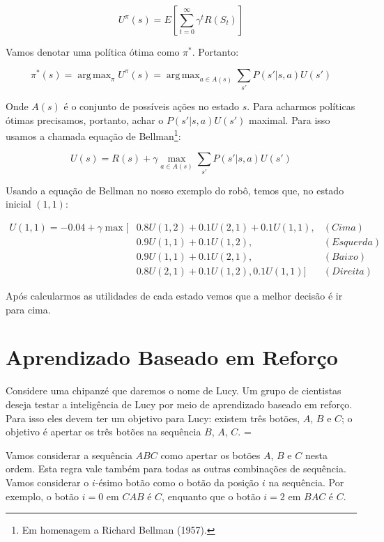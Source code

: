 \documentclass[a4paper,10pt]{article}
\DeclareMathOperator*{\argmax}{arg\,max}
\theoremstyle{plain}
\begin{document}
\begin{equation*}
  U^\pi(s) = E\left[\sum_{t=0}^\infty \gamma^t R(S_t)\right]
\end{equation*}

Vamos denotar uma política ótima como $\pi^*$. Portanto:

\begin{equation*}
  \pi^*(s) = \argmax_\pi U^\pi(s) = \argmax_{a \in A(s)} \sum_{s'} P(s'|s,a)U(s')
\end{equation*}

Onde $A(s)$ é o conjunto de possíveis ações no estado $s$. Para acharmos políticas ótimas
precisamos, portanto, achar o $P(s'|s,a)U(s')$ maximal. Para isso usamos a chamada equação de
Bellman\footnote{Em homenagem a Richard Bellman (1957).}:

\begin{equation*}
  U(s) = R(s) + \gamma \max_{a \in A(s)} \sum_{s'} P(s'|s,a)U(s')
\end{equation*}

Usando a equação de Bellman no nosso exemplo do robô, temos que, no estado inicial $(1, 1)$:

\begin{align*}
  U(1, 1) = -0.04 + \gamma \max[&0.8 U(1, 2) + 0.1 U(2, 1) + 0.1 U(1, 1), &(Cima) \\
                                &0.9 U(1, 1) + 0.1 U(1, 2), &(Esquerda) \\
                                &0.9 U(1, 1) + 0.1 U(2, 1), &(Baixo) \\
                                &0.8 U(2, 1) + 0.1 U(1, 2), 0.1U(1, 1)] &(Direita)
\end{align*}

Após calcularmos as utilidades de cada estado vemos que a melhor decisão é ir para cima.

\section{Aprendizado Baseado em Reforço}

Considere uma chipanzé que daremos o nome de Lucy. Um grupo de cientistas deseja testar a
inteligência de Lucy por meio de aprendizado baseado em reforço. Para isso eles devem ter um
objetivo para Lucy: existem três botões, $A$, $B$ e $C$; o objetivo é apertar os três botões na
sequência $B$, $A$, $C$. =

Vamos considerar a sequência $ABC$ como apertar os botões $A$, $B$ e $C$ nesta ordem. Esta regra
vale também para todas as outras combinações de sequência. Vamos considerar o $i$-ésimo botão como
o botão da posição $i$ na sequência. Por exemplo, o botão $i=0$ em $CAB$ é $C$, enquanto que o
botão $i=2$ em $BAC$ é $C$.
\end{document}
